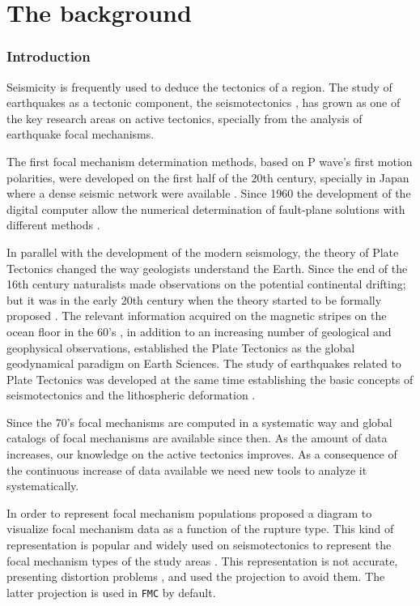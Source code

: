 \documentclass[11pt,a4paper,english]{article}
\numberwithin{equation}{section}
\begin{document}
\newpage{}

\part{The background}

\section{Introduction}

Seismicity is frequently used to deduce the tectonics of a region.
The study of earthquakes as a tectonic component, the seismotectonics
\citep{scholz}, has grown as one of the key research areas on active
tectonics, specially from the analysis of earthquake focal mechanisms.

The first focal mechanism determination methods, based on P wave's
first motion polarities, were developed on the first half of the 20th
century, specially in Japan where a dense seismic network were available
\citep{byer28,byer38,koni41,hond52,sche57}. Since 1960 the development
of the digital computer allow the numerical determination of fault-plane
solutions with different methods \citep[e.g.][]{knop61,lang75,dzie81}.

In parallel with the development of the modern seismology, the theory
of Plate Tectonics changed the way geologists understand the Earth.
Since the end of the 16th century naturalists made observations on
the potential continental drifting; but it was in the early 20th century
when the theory started to be formally proposed \citep{tayl10,wege12,schw19,holm31}.
The relevant information acquired on the magnetic stripes on the ocean
floor in the 60's \citep[e.g.][]{hess62,vine66,lepi68,morg68}, in
addition to an increasing number of geological and geophysical observations,
established the Plate Tectonics as the global geodynamical paradigm
on Earth Sciences. The study of earthquakes related to Plate Tectonics
was developed at the same time establishing the basic concepts of
seismotectonics and the lithospheric deformation \citep[e.g.][]{beni54,syke67,isac68,isac69}.

Since the 70's focal mechanisms are computed in a systematic way and
global catalogs of focal mechanisms are available since then. As the
amount of data increases, our knowledge on the active tectonics improves.
As a consequence of the continuous increase of data available we need
new tools to analyze it systematically.

In order to represent focal mechanism populations \citet{froh92}
proposed a diagram to visualize focal mechanism data as a function
of the rupture type. This kind of representation is popular and widely
used on seismotectonics to represent the focal mechanism types of
the study areas \citep[e.g.][]{froh97,borg01,igar01,ratc02,kita06,serp07}.
This representation is not accurate, presenting distortion problems
\citep{froh01}, and \citet{kaga05} used the \citet{kave96} projection
to avoid them. The latter projection is used in \texttt{FMC} by default.
\end{document}
